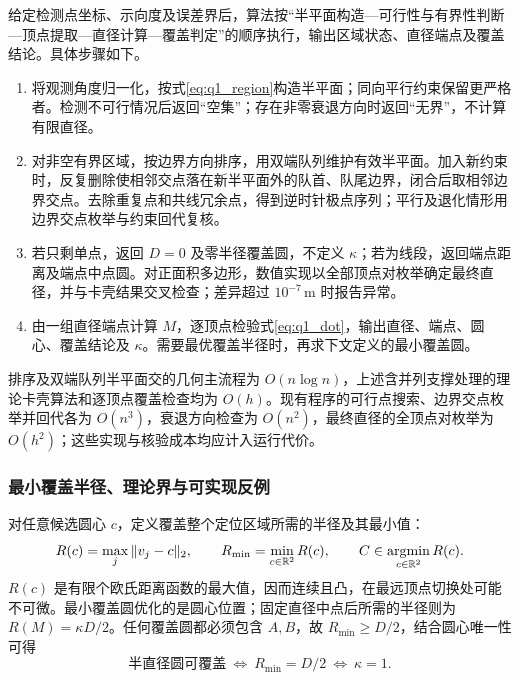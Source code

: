\documentclass[zihao=-4,a4paper,UTF8,fontset=none]{ctexart}
\begin{document}
给定检测点坐标、示向度及误差界后，算法按“半平面构造—可行性与有界性判断—顶点提取—直径计算—覆盖判定”的顺序执行，输出区域状态、直径端点及覆盖结论。具体步骤如下。
\begin{enumerate}
\item 将观测角度归一化，按式\eqref{eq:q1_region}构造半平面；同向平行约束保留更严格者。检测不可行情况后返回“空集”；存在非零衰退方向时返回“无界”，不计算有限直径。
\item 对非空有界区域，按边界方向排序，用双端队列维护有效半平面。加入新约束时，反复删除使相邻交点落在新半平面外的队首、队尾边界，闭合后取相邻边界交点。去除重复点和共线冗余点，得到逆时针极点序列；平行及退化情形用边界交点枚举与约束回代复核。
\item 若只剩单点，返回 $D=0$ 及零半径覆盖圆，不定义 $\kappa$；若为线段，返回端点距离及端点中点圆。对正面积多边形，数值实现以全部顶点对枚举确定最终直径，并与卡壳结果交叉检查；差异超过 $10^{-7}\,\mathrm m$ 时报告异常。
\item 由一组直径端点计算 $M$，逐顶点检验式\eqref{eq:q1_dot}，输出直径、端点、圆心、覆盖结论及 $\kappa$。需要最优覆盖半径时，再求下文定义的最小覆盖圆。
\end{enumerate}

排序及双端队列半平面交的几何主流程为 $O(n\log n)$，上述含并列支撑处理的理论卡壳算法和逐顶点覆盖检查均为 $O(h)$。现有程序的可行点搜索、边界交点枚举并回代各为 $O(n^3)$，衰退方向检查为 $O(n^2)$，最终直径的全顶点对枚举为 $O(h^2)$；这些实现与核验成本均应计入运行代价。

\subsubsection{最小覆盖半径、理论界与可实现反例}

对任意候选圆心 $c$，定义覆盖整个定位区域所需的半径及其最小值：
\begin{equation}
R(c)=\max_j\|v_j-c\|_2,\qquad
R_{\min}=\min_{c\in\mathbb R^2}R(c),\qquad
C\in\mathop{\rm argmin}_{c\in\mathbb R^2}R(c).
\label{eq:q1_radius}
\end{equation}
$R(c)$ 是有限个欧氏距离函数的最大值，因而连续且凸，在最远顶点切换处可能不可微。最小覆盖圆优化的是圆心位置；固定直径中点后所需的半径则为 $R(M)=\kappa D/2$。任何覆盖圆都必须包含 $A,B$，故 $R_{\min}\ge D/2$，结合圆心唯一性可得
\begin{equation}
\text{半直径圆可覆盖}
\ \Longleftrightarrow\ R_{\min}=D/2
\ \Longleftrightarrow\ \kappa=1.
\label{eq:q1_equivalence}
\end{equation}
\end{document}
